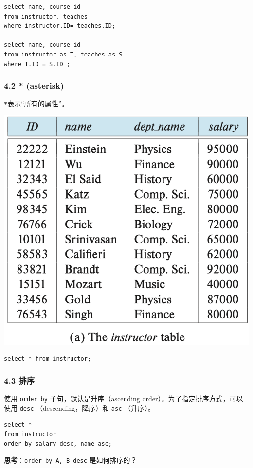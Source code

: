 \documentclass[aspectratio=169, 14pt]{beamer}
\begin{document}
\begin{frame}[fragile]

    \begin{verbatim} 
select name, course_id
from instructor, teaches
where instructor.ID= teaches.ID;   

select name, course_id
from instructor as T, teaches as S
where T.ID = S.ID ;
    \end{verbatim} 

\end{frame}

\begin{frame}[fragile]
    \frametitle{4.2 * (asterisk)}
\texttt{*}表示“所有的属性”。    

\includegraphics[width=.6\textwidth,trim={0cm 8.5cm 0cm 0cm},clip]{table/instructor}

\begin{verbatim} 
select * from instructor;
\end{verbatim} 


\end{frame}

\begin{frame}[fragile]
    \frametitle{4.3 排序}
    使用 \texttt{order by} 子句，默认是升序（ascending order）。为了指定排序方式，可以使用 \texttt{desc} （descending，降序）和 \texttt{asc} （升序）。

    \begin{verbatim} 
select *
from instructor
order by salary desc, name asc;        
    \end{verbatim}     

\pause \textbf{思考}：\alert{\texttt{order by A, B desc}} 是如何排序的？
\end{frame}
\end{document}

